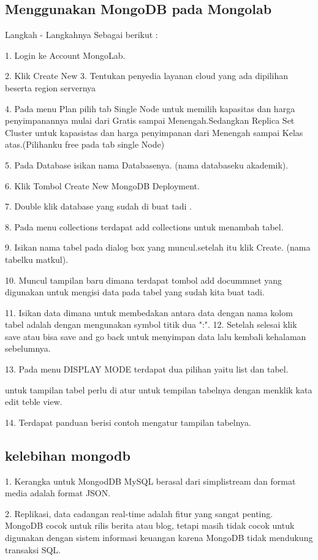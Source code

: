 {\subsection {Menggunakan MongoDB pada Mongolab}
Langkah - Langkahnya Sebagai berikut :

1. Login ke Account MongoLab.

2. Klik Create New
3. Tentukan penyedia layanan cloud yang ada dipilihan beserta region servernya

4. Pada menu Plan pilih tab Single Node untuk memilih kapasitas dan harga penyimpanannya mulai dari Gratis sampai Menengah.Sedangkan Replica Set Cluster untuk kapasistas dan harga penyimpanan dari Menengah sampai Kelas atas.(Pilihanku free pada tab single Node)

5. Pada Database isikan nama Databasenya. (nama databaseku akademik).

6. Klik Tombol Create New MongoDB Deployment.

7. Double klik database yang sudah di buat tadi .

8. Pada menu collections terdapat add collections untuk menambah tabel.

9. Isikan nama tabel pada dialog box yang muncul.setelah itu klik Create. (nama tabelku matkul).

10. Muncul tampilan baru dimana terdapat tombol add docummnet yang digunakan untuk mengisi data pada tabel yang sudah kita buat tadi.

11. Isikan data dimana untuk membedakan antara data dengan nama kolom tabel adalah dengan mengunakan symbol titik dua ":".
12. Setelah selesai klik save atau bisa save and go back untuk menyimpan data lalu kembali kehalaman sebelumnya.

13. Pada menu DISPLAY MODE terdapat dua pilihan yaitu list dan tabel. 

untuk tampilan tabel perlu di atur untuk tempilan tabelnya dengan menklik kata edit teble view.

14. Terdapat panduan berisi contoh mengatur tampilan tabelnya.

\subsection {kelebihan mongodb}

1. Kerangka untuk MongodDB MySQL berasal dari simplistream dan format media adalah format JSON.

2. Replikasi, data cadangan real-time adalah fitur yang sangat penting. MongoDB cocok untuk rilis berita atau blog, tetapi masih tidak cocok untuk digunakan dengan sistem informasi keuangan karena MongoDB tidak mendukung transaksi SQL.

}
